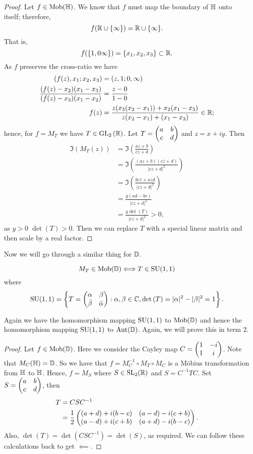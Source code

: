 \begin{proof}
    Let $f \in \operatorname{Mob}(\mathbb{H})$. 
    We know that $f$ must map the boundary of $\mathbb{H}$ onto itself; therefore, 
    \[ f(\mathbb{R} \cup \{\infty\}) = \mathbb{R} \cup \{\infty\}. \]
    That is,
    \[ f(\{1, 0 \infty\}) = \{x_1, x_2, x_3\} \subset \mathbb{R}. \]
    As $f$ preserves the cross-ratio we have
    \begin{align*}
        (f(z), x_1; x_2, x_3)       &= (z, 1; 0, \infty)        \\
        \frac{(f(z) - x_2)(x_1 - x_3)}{(f(z) - x_3)(x_1 - x_2)}
        &= \frac{z - 0}{1 - 0} \\
        f(z) &= \frac{z(x_3(x_2 - x_1)) + x_2(x_1 - x_3)}{z(x_2 - x_1) + (x_1 - x_3)} \in \mathbb{R};
    \end{align*}
    hence, for $f = M_T$ we have $T \in \operatorname{GL}_2{(\mathbb{R})}$.
    Let $T =  \begin{pmatrix} a & b \\ c & d \\ \end{pmatrix} $ and $z = x + iy$. Then
    \begin{align*}
        \Im\left(M_T(z)\right) &= \Im\left(\frac{az + b}{cz + d}\right) \\
        &= \Im\left(\frac{(az + b)(c\bar z + d)}{\lvert cz + d\rvert^2}\right) \\
        &= \Im\left(\frac{bc \bar z + azd}{\lvert cz + d \rvert^2}\right) \\
        &= \frac{y(ad - bc)}{\lvert cz + d \rvert^2} \\
        &= \frac{y \det{(T)}}{\lvert cz + d \rvert^2} > 0,
    \end{align*}
    as $y > 0$ $\det{(T)} > 0$. Then we can replace $T$ with a special linear matrix and then scale by a real factor.
\end{proof}

Now we will go through a similar thing for $\mathbb{D}$.

\begin{proposition}[]
    \[ M_T \in \operatorname{Mob}(\mathbb{D}) \Longleftrightarrow T \in \operatorname{SU}(1, 1) \]
    where 
    \[ \operatorname{SU}(1, 1) = \left\{ T =  \begin{pmatrix} \alpha & \beta \\ \bar{\beta} & \bar{\alpha} \\ \end{pmatrix} : \alpha, \beta \in \mathbb{C}, \det{(T)} = \lvert \alpha \rvert ^2 - \lvert \beta \rvert ^2 = 1 \right\}. \]
\end{proposition}

\begin{remark}
    Again we have the homomorphism mapping $\operatorname{SU}(1, 1)$ to $\operatorname{Mob}(\mathbb{D})$ and hence the homomorphism mapping $\operatorname{SU}(1, 1)$ to $\operatorname{Aut}(\mathbb{D})$. Again, we will prove this in term 2.
\end{remark}

\begin{proof}
    Let $f \in \operatorname{Mob}(\mathbb{D})$. 
    Here we consider the Cayley map $C =  \begin{pmatrix} 1 & -i \\ 1 & i \\ \end{pmatrix} $.
    Note that $M_C(\mathbb{H}) = \mathbb{D}$.
    So we have that $f = M_C^{-1} \circ M_T \circ M_C$ is a M\"obius transformation from $\mathbb{H}$ to $\mathbb{H}$.
    Hence, $f = M_S$ where 
    $S \in \operatorname{SL}_2(\mathbb{R})$ 
    and
    $S = C^{-1}TC$. Set $S =  \begin{pmatrix} a & b \\ c & d \\ \end{pmatrix} $, then 
    \begin{align*}
        T &= CSC^{-1} \\
          &= \frac 12  \begin{pmatrix} (a + d) + i (b - c) & (a - d) - i(c + b) \\ (a - d) + i(c + b) & (a + d) - i(b - c) \\ \end{pmatrix} .
    \end{align*}
    Also, $\det{(T)} = \det{(CSC^{-1})} = \det{(S)}$, as required. We can follow these calculations back to get $\impliedby$.
\end{proof}

